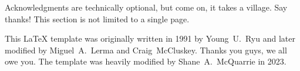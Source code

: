 Acknowledgments are technically optional, but come on, it takes a village. Say thanks!
This section is not limited to a single page.

This \LaTeX{} template was originally written in 1991 by Young~U.~Ryu and later modified by Miguel~A.~Lerma and Craig~McCluskey.
Thanks you guys, we all owe you.
The template was heavily modified by Shane~A.~McQuarrie in 2023.
